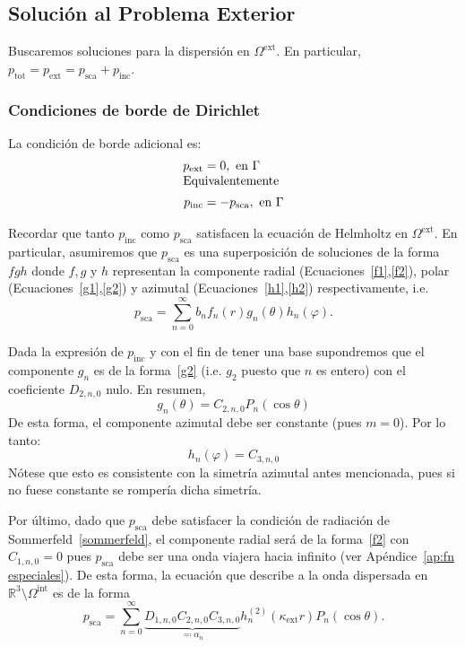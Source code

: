 \documentclass[11pt]{article}
\numberwithin{equation}{section}
\def\R{\mathbb{R}}
\def\tot{\textrm{tot}}
\def\exterior{\textrm{ext}}
\def\interior{\textrm{int}}
\def\inc{\textrm{inc}}
\def\sca{\textrm{sca}}
\begin{document}
\subsection{Solución al Problema Exterior}\label{ssec:a:exterior}

Buscaremos soluciones para la dispersión en \(\Omega^{\exterior}\). En particular,
\(p_{\tot} = p_{\exterior} = p_{\sca} + p_{\inc}\).

\subsubsection{Condiciones de borde de Dirichlet}
\label{ssec:a:exterior:dirichlet}

\noindent La condición de borde adicional es:
\begin{align}\label{bc:dirichlet}
	p_{\exterior} &= 0, \text{ en } \Gamma\\[-5pt]
	\intertext{Equivalentemente}
	p_{\inc} &= -p_{\sca}, \text{ en } \Gamma
\end{align}

Recordar que tanto \(p_{\inc}\) como \(p_{\sca}\) satisfacen la ecuación de
Helmholtz en \(\Omega^{\exterior}\). En particular, asumiremos que \(p_{\sca}\) es una
superposición de soluciones de la forma \(fgh\) donde \(f,g\) y \(h\) representan la componente
radial (Ecuaciones~\eqref{f1},\eqref{f2}), polar (Ecuaciones~\eqref{g1},\eqref{g2}) y azimutal
(Ecuaciones~\eqref{h1},\eqref{h2}) respectivamente, i.e.
\begin{displaymath}
	p_{\sca} = \sum_{n=0}^{\infty} b_n f_n(r) g_n(\theta) h_n(\varphi).
\end{displaymath}

Dada la expresión de \(p_{\inc}\) y con el fin de tener
una base supondremos que el componente \(g_n\) es de la forma~\eqref{g2} 
(i.e. \(g_2\) puesto que \(n\) es entero) con el coeficiente \(D_{2,n,0}\) nulo. 
En resumen,
\begin{equation}
\label{psca:g}
	g_n(\theta)
	=
	C_{2,n,0} P_{n} (\cos\theta)
\end{equation}
De esta forma, el componente azimutal debe ser constante (pues \(m=0\)).
Por lo tanto:
\begin{equation}\label{psca:h}
	h_n(\varphi)
	=
	C_{3,n,0}
\end{equation}
Nótese que esto es consistente con la simetría azimutal antes mencionada, pues si
no fuese constante se rompería dicha simetría.

Por último, dado que \(p_{\sca}\) debe satisfacer la condición de radiación de
Sommerfeld~\eqref{sommerfeld}, el componente radial será de la forma~\eqref{f2}
con \(C_{1,n,0} = 0\) pues \(p_{\sca}\) debe ser una onda viajera hacia infinito (ver
Apéndice~\ref{ap:fn especiales}). De esta forma, la ecuación que
describe a la onda dispersada en \(\R^3\setminus\Omega^{\interior}\) es de la
forma
\begin{equation}\label{psca:forma}
	p_{\sca}
	=
	\sum_{n=0}^{\infty}
	\underbrace{D_{1,n,0} C_{2,n,0} C_{3,n,0}}_{\eqqcolon \alpha_n}
		h_{n}^{(2)}(\kappa_{\exterior} r)
		P_{n}(\cos\theta)
.\end{equation}
\end{document}
